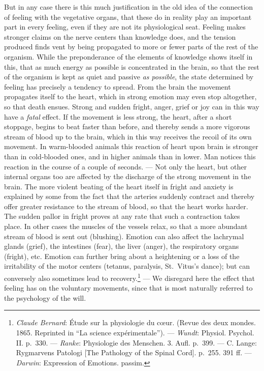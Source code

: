\documentclass[12pt,a4paper]{book}
\newcommand{\opage}[1]{\marginnote{\footnotesize\textit{[#1]}}}
\begin{document}
But in any case there is this much justification in the old idea of
the connection of feeling with the vegetative organs, that these do in
reality play an important part in every feeling, even if they are not
its physiological seat. Feeling makes stronger claims on the nerve
centers than knowledge does, and the tension produced finds vent by
being propagated to more or fewer parts of the rest of the organism.
While the preponderance of the elements of knowledge shows itself in
this, that as much energy as possible is concentrated in the brain, so
that the rest of the organism is kept as quiet and passive \emph{as
possible}, the state determined by feeling has precisely a tendency to
spread. From the brain the movement propagates itself to the heart,
which in strong emotion may even stop altogether, so that death ensues.
Strong and sudden fright, anger, grief or joy can in this way have a
\emph{fatal} effect. If the movement is less strong, the heart, after a
short stoppage, begins to beat faster than before, and thereby sends a
more vigorous stream of blood up to the brain, which in this way
receives the recoil of its own movement. In warm-blooded animals this
reaction of heart upon brain is stronger than in cold-blooded ones, and
in higher animals than in lower. Man notices this reaction in the course
of a couple of seconds. --- Not only the heart, but other internal
organs too are affected by the discharge of the strong movement in the
brain. The more violent beating of the heart itself in fright and
anxiety is explained by some from the fact that the arteries suddenly
contract and thereby offer greater resistance to the stream of blood,
so that the heart works harder.
\opage{321}The sudden pallor in fright proves at any rate that such a
contraction takes place. In other cases the muscles of the vessels
relax, so that a more abundant stream of blood is sent out (blushing).
Emotion can also affect the lachrymal glands (grief), the intestines
(fear), the liver (anger), the respiratory organs (fright), etc. Emotion
can further bring about a heightening or a loss of the irritability of
the motor centers (tetanus, paralysis, St.~Vitus's dance); but can
conversely also sometimes lead to
recovery.\footnote{\emph{Claude Bernard}: Étude sur la physiologie
du cœur. (Revue des deux mondes. 1865. Reprinted in ``La science
expérimentale''). --- \emph{Wundt}: Physiol. Psychol. II. p.~330. ---
\emph{Ranke}: Physiologie des Menschen. 3. Aufl. p.~399. --- C. Lange:
Rygmarvens Patologi [The Pathology of the Spinal Cord]. p.~255. 391 ff.
--- \emph{Darwin}: Expression of Emotions. passim.} --- We disregard
here the effect that feeling has on the voluntary movements, since that
is most naturally referred to the psychology of the will.
\end{document}
